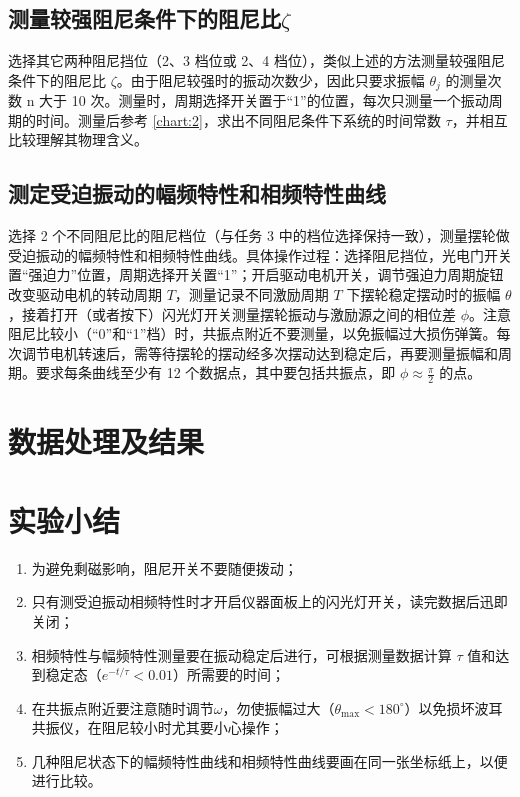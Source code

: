 \documentclass[12pt,a4paper]{amsart}
\begin{document}
\subsection{测量较强阻尼条件下的阻尼比$\zeta$}

选择其它两种阻尼挡位（2、3 档位或 2、4 档位），类似上述的方法测量较强阻尼条件下的阻尼比 $\zeta$。由于阻尼较强时的振动次数少，因此只要求振幅 $\theta_j$ 的测量次数 n 大于 10 次。测量时，周期选择开关置于“1”的位置，每次只测量一个振动周期的时间。测量后参考 \ref{chart:2}，求出不同阻尼条件下系统的时间常数 $\tau$，并相互比较理解其物理含义。

\subsection{测定受迫振动的幅频特性和相频特性曲线}

选择 2 个不同阻尼比的阻尼档位（与任务 3 中的档位选择保持一致），测量摆轮做受迫振动的幅频特性和相频特性曲线。具体操作过程：选择阻尼挡位，光电门开关置“强迫力”位置，周期选择开关置“1”；开启驱动电机开关，调节强迫力周期旋钮改变驱动电机的转动周期 $T$，测量记录不同激励周期 $T$ 下摆轮稳定摆动时的振幅 $\theta$，接着打开（或者按下）闪光灯开关测量摆轮振动与激励源之间的相位差 $\phi$。注意阻尼比较小（“0”和“1”档）时，共振点附近不要测量，以免振幅过大损伤弹簧。每次调节电机转速后，需等待摆轮的摆动经多次摆动达到稳定后，再要测量振幅和周期。要求每条曲线至少有 12 个数据点，其中要包括共振点，即 $\phi\approx\frac{\pi}{2}$ 的点。

\section{数据处理及结果}

\section{实验小结}

\begin{enumerate}
	\item 为避免剩磁影响，阻尼开关不要随便拨动；
	\item 只有测受迫振动相频特性时才开启仪器面板上的闪光灯开关，读完数据后迅即关闭；
	\item 相频特性与幅频特性测量要在振动稳定后进行，可根据测量数据计算 $\tau$ 值和达到稳定态（$e^{-t/\tau}<0.01$）所需要的时间；
	\item 在共振点附近要注意随时调节$\omega$，勿使振幅过大（$\theta_{\text{max}}<180^\circ$）以免损坏波耳共振仪，在阻尼较小时尤其要小心操作；
	\item 几种阻尼状态下的幅频特性曲线和相频特性曲线要画在同一张坐标纸上，以便进行比较。
\end{enumerate}
\end{document}
